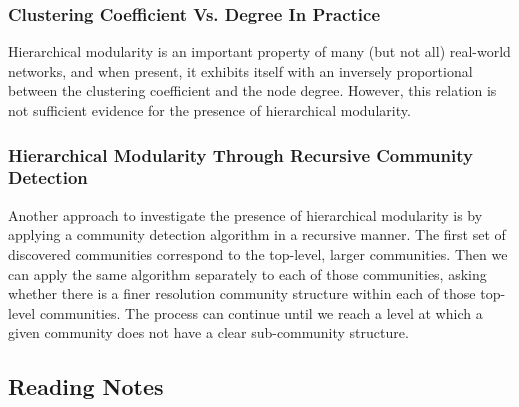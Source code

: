 \documentclass[11pt]{scrartcl} %
\begin{document}
\subsubsection{Clustering Coefficient Vs. Degree In Practice}
Hierarchical modularity is an important property of many (but not all) real-world networks, and when present, it exhibits itself with an inversely proportional between the clustering coefficient and the node degree. However, this relation is not sufficient evidence for the presence of hierarchical modularity. 

\subsubsection{Hierarchical Modularity Through Recursive Community Detection}
Another approach to investigate the presence of hierarchical modularity is by applying a community detection algorithm in a recursive manner. The first set of discovered communities correspond to the top-level, larger communities. Then we can apply the same algorithm separately to each of those communities, asking whether there is a finer resolution community structure within each of those top-level communities. The process can continue until we reach a level at which a given community does not have a clear sub-community structure.



\subsubsection{}
\subsubsection{}
\subsubsection{}
\subsubsection{}
\subsubsection{}



\subsection{Reading Notes}
\end{document}
